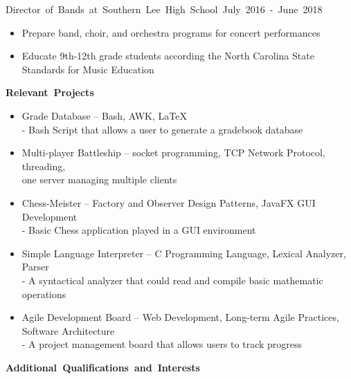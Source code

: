 \documentclass[10pt]{letter}
\begin{document}
    \vspace{0.5 mm}
    \hbox{Director of Bands at Southern Lee High School \hspace{165pt}
        July 2016 - June 2018}
    \vspace{-3 mm}
    \begin{itemize}
        \itemsep 0em
        \item Prepare band, choir, and orchestra programs for concert 
            performances
        \item Educate 9th-12th grade students according the North Carolina
            State Standards for Music Education
    \end{itemize}

    \vspace{6 mm}
    \hbox{\textbf{\large {Relevant Projects}}}
    \begin{itemize}
        \itemsep 0em
        \item Grade Database -- Bash, AWK, \LaTeX \\
        - Bash Script that allows a user to generate a gradebook database
        \item Multi-player Battleship -- socket programming, TCP Network Protocol, threading, \\
        one server managing multiple clients
        \item Chess-Meister -- Factory and Observer Design Patterns, JavaFX GUI Development \\
        - Basic Chess application played in a GUI environment
        \item Simple Language Interpreter -- C Programming Language, Lexical Analyzer, Parser \\
        - A syntactical analyzer that could read and compile basic mathematic operations
        \item Agile Development Board -- Web Development, Long-term Agile Practices, Software 
            Architecture \\
        - A project management board that allows users to track progress
    \end{itemize}
    
    \vspace {6 mm}
    \hbox{\textbf{\large {Additional Qualifications and Interests}}}
\end{document}
